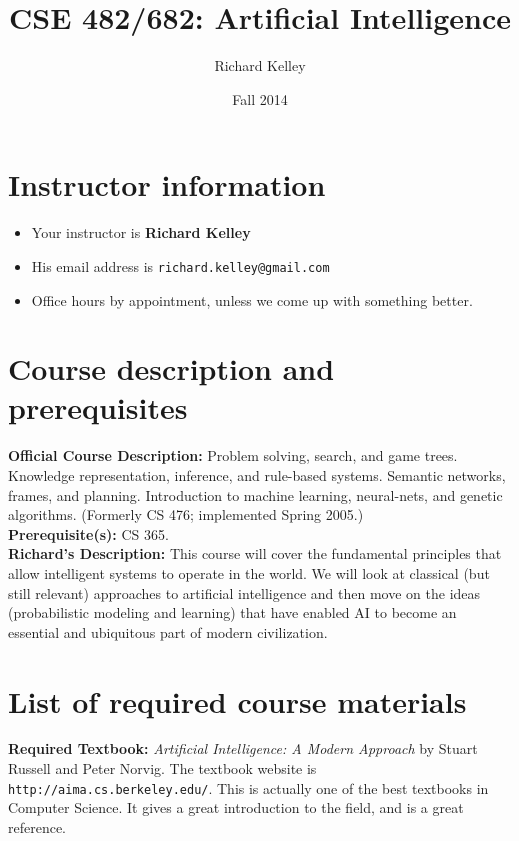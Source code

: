 \documentclass{article}
\begin{document}
\title{CSE 482/682: Artificial Intelligence}
\author{Richard Kelley}
\date{Fall 2014}
\maketitle

\section*{Instructor information}

\begin{itemize}
  \item Your instructor is \textbf{Richard Kelley}
  \item His email address is \verb|richard.kelley@gmail.com|
  \item Office hours by appointment, unless we come up with something better.
\end{itemize} 

\section*{Course description and prerequisites}

\textbf{Official Course Description:} Problem solving, search, and
game trees. Knowledge representation, inference, and rule-based
systems. Semantic networks, frames, and planning. Introduction to
machine learning, neural-nets, and genetic algorithms. (Formerly CS
476; implemented Spring 2005.)\\

\noindent
\textbf{Prerequisite(s):} CS 365.\\

\noindent
\textbf{Richard's Description:} This course will cover the fundamental
principles that allow intelligent systems to operate in the world. We
will look at classical (but still relevant) approaches to artificial
intelligence and then move on the ideas (probabilistic modeling and
learning) that have enabled AI to become an essential and ubiquitous
part of modern civilization.

\section*{List of required course materials}

\textbf{Required Textbook: } \textit{Artificial Intelligence: A Modern
  Approach} by Stuart Russell and Peter Norvig. The textbook website is
\verb|http://aima.cs.berkeley.edu/|. This is actually one of the best
textbooks in Computer Science. It gives a great introduction to the
field, and is a great reference.
\end{document}
